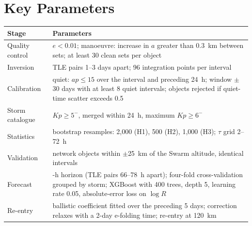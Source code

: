 \documentclass[11pt]{article}
\newcommand{\Kp}{\mathit{Kp}}
\newcommand{\ap}{\mathit{ap}}
\begin{document}
\section{Key Parameters}\label{app:params}
\begin{table}[H]
\centering\small
\begin{tabular}{@{}>{\raggedright}p{3.6cm}>{\raggedright\arraybackslash}p{11.4cm}@{}}
\toprule
Stage & Parameters \\
\midrule
Quality control & $e < 0.01$; manoeuvre: increase in $a$ greater than 0.3~km between sets; at least 30 clean sets per object \\
Inversion & TLE pairs 1--3 days apart; 96 integration points per interval \\
Calibration & quiet: $\ap \leq 15$ over the interval and preceding 24~h; window $\pm$30 days with at least 8 quiet intervals; objects rejected if quiet-time scatter exceeds 0.5 \\
Storm catalogue & $\Kp \geq 5^-$, merged within 24~h, maximum $\Kp \geq 6^-$ \\
Statistics & bootstrap resamples: 2,000 (H1), 500 (H2), 1,000 (H3); $\tau$ grid 2--72~h \\
Validation & network objects within $\pm$25~km of the Swarm altitude, identical intervals \\
Forecast & 72-h horizon (TLE pairs 66--78~h apart); four-fold cross-validation grouped by storm; XGBoost with 400 trees, depth 5, learning rate 0.05, absolute-error loss on $\log R$ \\
Re-entry & ballistic coefficient fitted over the preceding 5 days; correction relaxes with a 2-day e-folding time; re-entry at 120~km \\
\bottomrule
\end{tabular}
\end{table}
\end{document}
